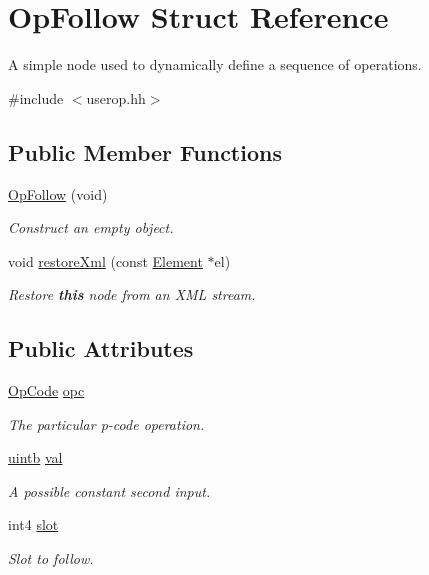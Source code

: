 \hypertarget{struct_op_follow}{}\section{Op\+Follow Struct Reference}
\label{struct_op_follow}


A simple node used to dynamically define a sequence of operations.  




{\ttfamily \#include $<$userop.\+hh$>$}

\subsection*{Public Member Functions}
\begin{DoxyCompactItemize}
\item 
\mbox{\hyperlink{struct_op_follow_a5eb345f3be76c5ff4b0c90f4a4a64091}{Op\+Follow}} (void)
\begin{DoxyCompactList}\small\item\em Construct an empty object. \end{DoxyCompactList}\item 
void \mbox{\hyperlink{struct_op_follow_a31cd6faa65b443adea57d0830b87d16b}{restore\+Xml}} (const \mbox{\hyperlink{class_element}{Element}} $\ast$el)
\begin{DoxyCompactList}\small\item\em Restore {\bfseries{this}} node from an X\+ML stream. \end{DoxyCompactList}\end{DoxyCompactItemize}
\subsection*{Public Attributes}
\begin{DoxyCompactItemize}
\item 
\mbox{\hyperlink{opcodes_8hh_abeb7dfb0e9e2b3114e240a405d046ea7}{Op\+Code}} \mbox{\hyperlink{struct_op_follow_a9b8a62fc43b7a806b8cc339d68422749}{opc}}
\begin{DoxyCompactList}\small\item\em The particular p-\/code operation. \end{DoxyCompactList}\item 
\mbox{\hyperlink{types_8h_a2db313c5d32a12b01d26ac9b3bca178f}{uintb}} \mbox{\hyperlink{struct_op_follow_a1a70586a4329aae03bf49b7e129eed8c}{val}}
\begin{DoxyCompactList}\small\item\em A possible constant second input. \end{DoxyCompactList}\item 
int4 \mbox{\hyperlink{struct_op_follow_a6a4f47ec389b5c9ef9ee6ecfa259fdb8}{slot}}
\begin{DoxyCompactList}\small\item\em Slot to follow. \end{DoxyCompactList}\end{DoxyCompactItemize}


